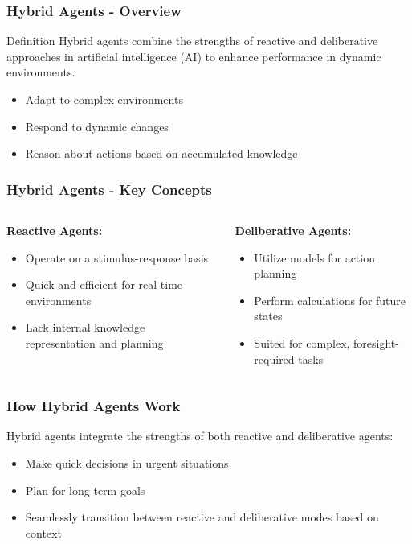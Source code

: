 \documentclass[aspectratio=169]{beamer}
\begin{document}
\begin{frame}[fragile]
    \frametitle{Hybrid Agents - Overview}
    \begin{block}{Definition}
        Hybrid agents combine the strengths of reactive and deliberative approaches in artificial intelligence (AI) to enhance performance in dynamic environments.
    \end{block}
    \begin{itemize}
        \item Adapt to complex environments
        \item Respond to dynamic changes
        \item Reason about actions based on accumulated knowledge
    \end{itemize}
\end{frame}

\begin{frame}[fragile]
    \frametitle{Hybrid Agents - Key Concepts}
    \begin{columns}
        \begin{column}{0.5\textwidth}
            \textbf{Reactive Agents:}
            \begin{itemize}
                \item Operate on a stimulus-response basis
                \item Quick and efficient for real-time environments
                \item Lack internal knowledge representation and planning
            \end{itemize}
        \end{column}

        \begin{column}{0.5\textwidth}
            \textbf{Deliberative Agents:}
            \begin{itemize}
                \item Utilize models for action planning
                \item Perform calculations for future states
                \item Suited for complex, foresight-required tasks
            \end{itemize}
        \end{column}
    \end{columns}
\end{frame}

\begin{frame}[fragile]
    \frametitle{How Hybrid Agents Work}
    Hybrid agents integrate the strengths of both reactive and deliberative agents:
    \begin{itemize}
        \item Make quick decisions in urgent situations
        \item Plan for long-term goals
        \item Seamlessly transition between reactive and deliberative modes based on context
    \end{itemize}
\end{frame}
\end{document}
